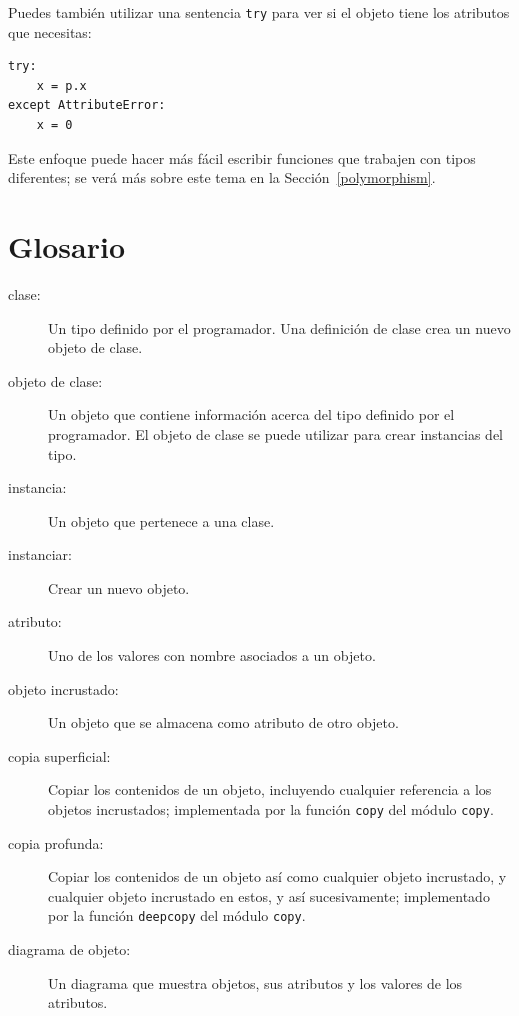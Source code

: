 \documentclass[10pt]{book}
\begin{document}
Puedes también utilizar una sentencia {\tt try} para ver si el objeto tiene los
atributos que necesitas:

\begin{verbatim}
try:
    x = p.x
except AttributeError:
    x = 0
\end{verbatim}

Este enfoque puede hacer más fácil escribir funciones que trabajen con
tipos diferentes; se verá más sobre este tema
en la Sección~\ref{polymorphism}.


\section{Glosario}

\begin{description}

\item[clase:] Un tipo definido por el programador.  Una definición de clase crea un nuevo
objeto de clase.

\item[objeto de clase:] Un objeto que contiene información acerca del
tipo definido por el programador.  El objeto de clase se puede utilizar para crear instancias
del tipo.

\item[instancia:] Un objeto que pertenece a una clase.

\item[instanciar:] Crear un nuevo objeto.

\item[atributo:] Uno de los valores con nombre asociados a un objeto.

\item[objeto incrustado:] Un objeto que se almacena como atributo
de otro objeto.

\item[copia superficial:] Copiar los contenidos de un objeto, incluyendo
cualquier referencia a los objetos incrustados;
implementada por la función {\tt copy} del módulo {\tt copy}.

\item[copia profunda:] Copiar los contenidos de un objeto así como cualquier
objeto incrustado, y cualquier objeto incrustado en estos, y así sucesivamente;
implementado por la función {\tt deepcopy} del módulo {\tt copy}.

\item[diagrama de objeto:] Un diagrama que muestra objetos, sus
atributos y los valores de los atributos.

\end{description}
\end{document}
